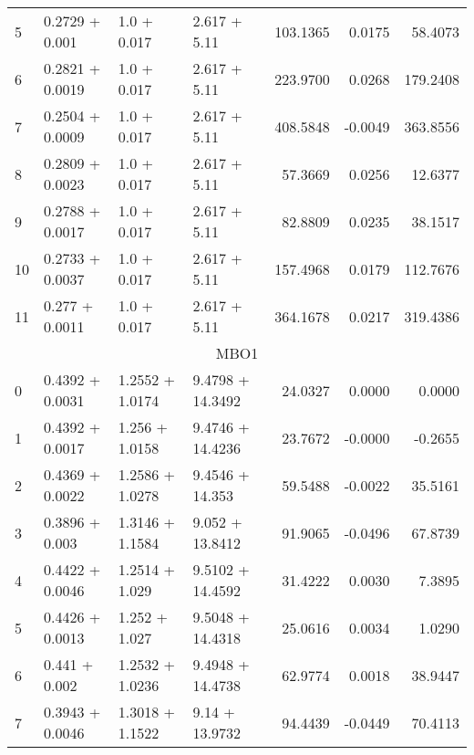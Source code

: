 \begin{tabular}{llllrrr}
  5  &   0.2729 + 0.001 &   1.0 + 0.017 &    2.617 + 5.11 &            103.1365 &                 0.0175 &        58.4073 \\
  6  &  0.2821 + 0.0019 &   1.0 + 0.017 &    2.617 + 5.11 &            223.9700 &                 0.0268 &       179.2408 \\
  7  &  0.2504 + 0.0009 &   1.0 + 0.017 &    2.617 + 5.11 &            408.5848 &                -0.0049 &       363.8556 \\
  8  &  0.2809 + 0.0023 &   1.0 + 0.017 &    2.617 + 5.11 &             57.3669 &                 0.0256 &        12.6377 \\
  9  &  0.2788 + 0.0017 &   1.0 + 0.017 &    2.617 + 5.11 &             82.8809 &                 0.0235 &        38.1517 \\
  10 &  0.2733 + 0.0037 &   1.0 + 0.017 &    2.617 + 5.11 &            157.4968 &                 0.0179 &       112.7676 \\
  11 &   0.277 + 0.0011 &   1.0 + 0.017 &    2.617 + 5.11 &            364.1678 &                 0.0217 &       319.4386 \\
  \midrule
  \multicolumn{7}{c}{MBO1} \\
  \midrule
  0  &  0.4392 + 0.0031 &  1.2552 + 1.0174 &  9.4798 + 14.3492 &             24.0327 &                 0.0000 &         0.0000 \\
  1  &  0.4392 + 0.0017 &   1.256 + 1.0158 &  9.4746 + 14.4236 &             23.7672 &                -0.0000 &        -0.2655 \\
  2  &  0.4369 + 0.0022 &  1.2586 + 1.0278 &   9.4546 + 14.353 &             59.5488 &                -0.0022 &        35.5161 \\
  3  &   0.3896 + 0.003 &  1.3146 + 1.1584 &   9.052 + 13.8412 &             91.9065 &                -0.0496 &        67.8739 \\
  4  &  0.4422 + 0.0046 &   1.2514 + 1.029 &  9.5102 + 14.4592 &             31.4222 &                 0.0030 &         7.3895 \\
  5  &  0.4426 + 0.0013 &    1.252 + 1.027 &  9.5048 + 14.4318 &             25.0616 &                 0.0034 &         1.0290 \\
  6  &    0.441 + 0.002 &  1.2532 + 1.0236 &  9.4948 + 14.4738 &             62.9774 &                 0.0018 &        38.9447 \\
  7  &  0.3943 + 0.0046 &  1.3018 + 1.1522 &    9.14 + 13.9732 &             94.4439 &                -0.0449 &        70.4113 \\

\end{tabular}
